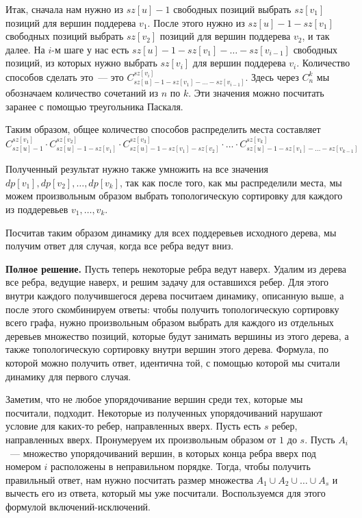 Итак, сначала нам нужно из $sz[u] - 1$ свободных позиций выбрать $sz[v_1]$ позиций для вершин поддерева $v_1$. После этого нужно из $sz[u] - 1 - sz[v_1]$ свободных позиций выбрать $sz[v_2]$ позиций для вершин поддерева $v_2$, и так далее. На $i$-м шаге у нас есть $sz[u] - 1 - sz[v_1] - \ldots - sz[v_{i - 1}]$ свободных позиций, из которых нужно выбрать $sz[v_i]$ для вершин поддерева $v_i$. Количество способов сделать это~--- это $C_{sz[u] - 1 - sz[v_1] - \ldots - sz[v_{i - 1}]}^{sz[v_i]}$. Здесь через $C_n^k$ мы обозначаем количество сочетаний из $n$ по $k$. Эти значения можно посчитать заранее с помощью треугольника Паскаля.

Таким образом, общее количество способов распределить места составляет
$$C_{sz[u] - 1}^{sz[v_1]} \cdot C_{sz[u] - 1 - sz[v_1]}^{sz[v_2]} \cdot C_{sz[u] - 1 - sz[v_1] - sz[v_2]}^{sz[v_3]} \cdot \ldots \cdot C_{sz[u] - 1 - sz[v_1] - \ldots - sz[v_{k - 1}]}^{sz[v_k]}$$

Полученный результат нужно также умножить на все значения $dp[v_1], dp[v_2], \ldots, dp[v_k]$, так как после того, как мы распределили места, мы можем произвольным образом выбрать топологическую сортировку для каждого из поддеревьев $v_1, \ldots, v_k$.

Посчитав таким образом динамику для всех поддеревьев исходного дерева, мы получим ответ для случая, когда все ребра ведут вниз.

\textbf{Полное решение.}
Пусть теперь некоторые ребра ведут наверх. Удалим из дерева все ребра, ведущие наверх, и решим задачу для оставшихся ребер. Для этого внутри каждого получившегося дерева посчитаем динамику, описанную выше,  а после этого скомбинируем ответы: чтобы получить топологическую сортировку всего графа, нужно произвольным образом выбрать для каждого из отдельных деревьев множество позиций, которые будут занимать вершины из этого дерева, а также топологическую сортировку внутри вершин этого дерева. Формула, по которой можно получить ответ, идентична той, с помощью которой мы считали динамику для первого случая.

Заметим, что не любое упорядочивание вершин среди тех, которые мы посчитали, подходит. Некоторые из полученных упорядочиваний нарушают условие для каких-то ребер, направленных вверх. Пусть есть $s$ ребер, направленных вверх. Пронумеруем их произвольным образом от $1$ до $s$. Пусть $A_i$~--- множество упорядочиваний вершин, в которых конца ребра вверх под номером $i$ расположены в неправильном порядке. Тогда, чтобы получить правильный ответ, нам нужно посчитать размер множества $A_1 \cup A_2 \cup \ldots \cup A_s$ и вычесть его из ответа, который мы уже посчитали. Воспользуемся для этого формулой включений-исключений.

